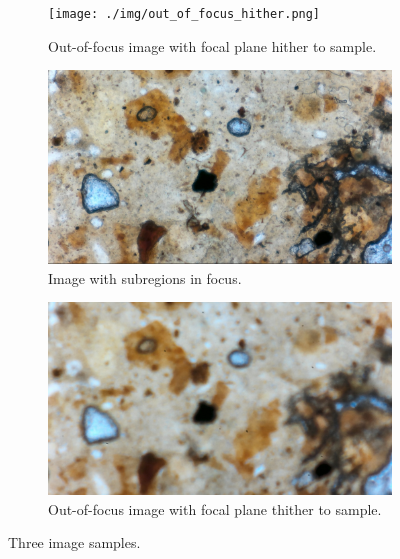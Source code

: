 \documentclass[a4paper,11pt]{article}
\begin{document}
\begin{figure}
    \begin{subfigure}[t]{0.3\textwidth}
        \centering
        \texttt{[image: ./img/out\_of\_focus\_hither.png]}
        \caption{Out-of-focus image with focal plane hither to sample.}
        \label{fig:focusHither}
    \end{subfigure}
    \hfill
    \begin{subfigure}[t]{0.3\textwidth}
        \centering
        \includegraphics[width=\textwidth]{./img/subregion_focus.png}
        \caption{Image with subregions in focus.}
        \label{fig:focus}
    \end{subfigure}
    \hfill
    \begin{subfigure}[t]{0.3\textwidth}
        \centering
        \includegraphics[width=\textwidth]{./img/out_of_focus_thither.png}
        \caption{Out-of-focus image with focal plane thither to sample.}
        \label{fig:focusThither}
    \end{subfigure}
    \caption{Three image samples.}
    \label{fig:focusComparison}
\end{figure}
\end{document}
